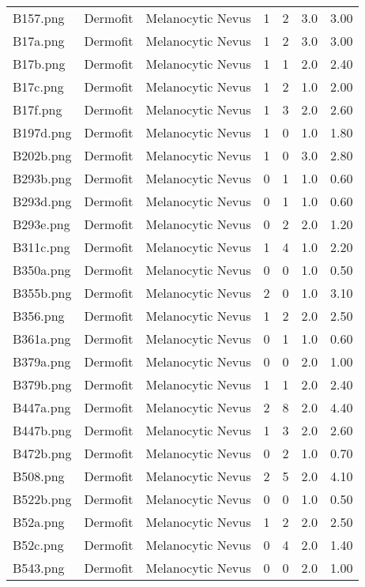 \begin{longtable}{ | l | l | l | l | l | l | l |}
B157.png & Dermofit & Melanocytic Nevus & 1 & 2 & 3.0 & 3.00 \\ 
B17a.png & Dermofit & Melanocytic Nevus & 1 & 2 & 3.0 & 3.00 \\ 
B17b.png & Dermofit & Melanocytic Nevus & 1 & 1 & 2.0 & 2.40 \\ 
B17c.png & Dermofit & Melanocytic Nevus & 1 & 2 & 1.0 & 2.00 \\ 
B17f.png & Dermofit & Melanocytic Nevus & 1 & 3 & 2.0 & 2.60 \\ 
B197d.png & Dermofit & Melanocytic Nevus & 1 & 0 & 1.0 & 1.80 \\ 
B202b.png & Dermofit & Melanocytic Nevus & 1 & 0 & 3.0 & 2.80 \\ 
B293b.png & Dermofit & Melanocytic Nevus & 0 & 1 & 1.0 & 0.60 \\ 
B293d.png & Dermofit & Melanocytic Nevus & 0 & 1 & 1.0 & 0.60 \\ 
B293e.png & Dermofit & Melanocytic Nevus & 0 & 2 & 2.0 & 1.20 \\ 
B311c.png & Dermofit & Melanocytic Nevus & 1 & 4 & 1.0 & 2.20 \\ 
B350a.png & Dermofit & Melanocytic Nevus & 0 & 0 & 1.0 & 0.50 \\ 
B355b.png & Dermofit & Melanocytic Nevus & 2 & 0 & 1.0 & 3.10 \\ 
B356.png & Dermofit & Melanocytic Nevus & 1 & 2 & 2.0 & 2.50 \\ 
B361a.png & Dermofit & Melanocytic Nevus & 0 & 1 & 1.0 & 0.60 \\ 
B379a.png & Dermofit & Melanocytic Nevus & 0 & 0 & 2.0 & 1.00 \\ 
B379b.png & Dermofit & Melanocytic Nevus & 1 & 1 & 2.0 & 2.40 \\ 
B447a.png & Dermofit & Melanocytic Nevus & 2 & 8 & 2.0 & 4.40 \\ 
B447b.png & Dermofit & Melanocytic Nevus & 1 & 3 & 2.0 & 2.60 \\ 
B472b.png & Dermofit & Melanocytic Nevus & 0 & 2 & 1.0 & 0.70 \\ 
B508.png & Dermofit & Melanocytic Nevus & 2 & 5 & 2.0 & 4.10 \\ 
B522b.png & Dermofit & Melanocytic Nevus & 0 & 0 & 1.0 & 0.50 \\ 
B52a.png & Dermofit & Melanocytic Nevus & 1 & 2 & 2.0 & 2.50 \\ 
B52c.png & Dermofit & Melanocytic Nevus & 0 & 4 & 2.0 & 1.40 \\ 
B543.png & Dermofit & Melanocytic Nevus & 0 & 0 & 2.0 & 1.00 \\ 

\end{longtable}
